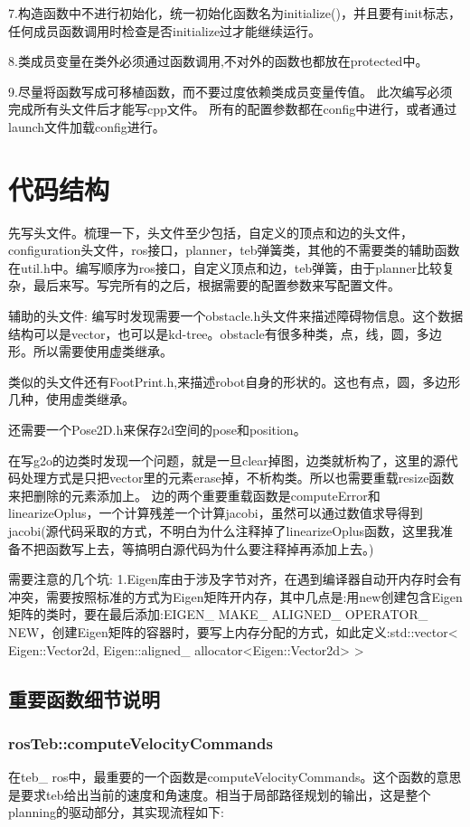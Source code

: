 \documentclass[10pt,a4paper]{article}
\theoremstyle{mythm}
\numberwithin{equation}{section}
\begin{document}
7.构造函数中不进行初始化，统一初始化函数名为initialize()，并且要有init标志，任何成员函数调用时检查是否initialize过才能继续运行。

8.类成员变量在类外必须通过函数调用,不对外的函数也都放在protected中。

9.尽量将函数写成可移植函数，而不要过度依赖类成员变量传值。
此次编写必须完成所有头文件后才能写cpp文件。
所有的配置参数都在config中进行，或者通过launch文件加载config进行。
\section{代码结构}
先写头文件。梳理一下，头文件至少包括，自定义的顶点和边的头文件，configuration头文件，ros接口，planner，teb弹簧类，其他的不需要类的辅助函数在util.h中。编写顺序为ros接口，自定义顶点和边，teb弹簧，由于planner比较复杂，最后来写。写完所有的之后，根据需要的配置参数来写配置文件。

辅助的头文件:
编写时发现需要一个obstacle.h头文件来描述障碍物信息。这个数据结构可以是vector，也可以是kd-tree。obstacle有很多种类，点，线，圆，多边形。所以需要使用虚类继承。

类似的头文件还有FootPrint.h,来描述robot自身的形状的。这也有点，圆，多边形几种，使用虚类继承。

还需要一个Pose2D.h来保存2d空间的pose和position。

在写g2o的边类时发现一个问题，就是一旦clear掉图，边类就析构了，这里的源代码处理方式是只把vector里的元素erase掉，不析构类。所以也需要重载resize函数来把删除的元素添加上。
边的两个重要重载函数是computeError和linearizeOplus，一个计算残差一个计算jacobi，虽然可以通过数值求导得到jacobi(源代码采取的方式，不明白为什么注释掉了linearizeOplus函数，这里我准备不把函数写上去，等搞明白源代码为什么要注释掉再添加上去。)

需要注意的几个坑:
1.Eigen库由于涉及字节对齐，在遇到编译器自动开内存时会有冲突，需要按照标准的方式为Eigen矩阵开内存，其中几点是:用new创建包含Eigen矩阵的类时，要在最后添加:EIGEN\_ MAKE\_ ALIGNED\_ OPERATOR\_ NEW，创建Eigen矩阵的容器时，要写上内存分配的方式，如此定义:std::vector< Eigen::Vector2d, Eigen::aligned\_ allocator<Eigen::Vector2d> >
\subsection{重要函数细节说明}
\subsubsection{rosTeb::computeVelocityCommands}
在teb\_ ros中，最重要的一个函数是computeVelocityCommands。这个函数的意思是要求teb给出当前的速度和角速度。相当于局部路径规划的输出，这是整个planning的驱动部分，其实现流程如下:
\end{document}
